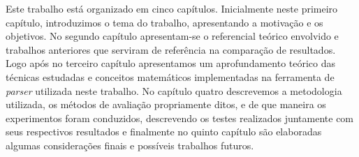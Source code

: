 Este trabalho está organizado em cinco capítulos. Inicialmente neste primeiro capítulo, introduzimos o tema do trabalho, apresentando a motivação e os objetivos. No segundo capítulo apresentam-se o referencial teórico envolvido e trabalhos anteriores que serviram de referência na comparação de resultados. Logo após no terceiro capítulo apresentamos um aprofundamento teórico das técnicas estudadas e conceitos matemáticos implementadas na ferramenta de \emph{parser} utilizada neste trabalho. No capítulo quatro descrevemos a metodologia utilizada, os métodos de avaliação propriamente ditos, e de que maneira os experimentos foram conduzidos, descrevendo os testes realizados juntamente com seus respectivos resultados e finalmente no quinto capítulo são elaboradas algumas considerações finais e possíveis trabalhos futuros.
